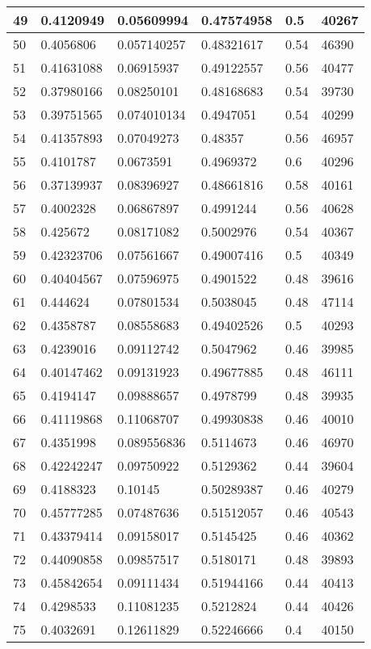 \begin{longtable}{|l|l|l|l|l|l|}
49 & 0.4120949 & 0.05609994 & 0.47574958 & 0.5 & 40267 \\ \hline 
50 & 0.4056806 & 0.057140257 & 0.48321617 & 0.54 & 46390 \\ \hline 
51 & 0.41631088 & 0.06915937 & 0.49122557 & 0.56 & 40477 \\ \hline 
52 & 0.37980166 & 0.08250101 & 0.48168683 & 0.54 & 39730 \\ \hline 
53 & 0.39751565 & 0.074010134 & 0.4947051 & 0.54 & 40299 \\ \hline 
54 & 0.41357893 & 0.07049273 & 0.48357 & 0.56 & 46957 \\ \hline 
55 & 0.4101787 & 0.0673591 & 0.4969372 & 0.6 & 40296 \\ \hline 
56 & 0.37139937 & 0.08396927 & 0.48661816 & 0.58 & 40161 \\ \hline 
57 & 0.4002328 & 0.06867897 & 0.4991244 & 0.56 & 40628 \\ \hline 
58 & 0.425672 & 0.08171082 & 0.5002976 & 0.54 & 40367 \\ \hline 
59 & 0.42323706 & 0.07561667 & 0.49007416 & 0.5 & 40349 \\ \hline 
60 & 0.40404567 & 0.07596975 & 0.4901522 & 0.48 & 39616 \\ \hline 
61 & 0.444624 & 0.07801534 & 0.5038045 & 0.48 & 47114 \\ \hline 
62 & 0.4358787 & 0.08558683 & 0.49402526 & 0.5 & 40293 \\ \hline 
63 & 0.4239016 & 0.09112742 & 0.5047962 & 0.46 & 39985 \\ \hline 
64 & 0.40147462 & 0.09131923 & 0.49677885 & 0.48 & 46111 \\ \hline 
65 & 0.4194147 & 0.09888657 & 0.4978799 & 0.48 & 39935 \\ \hline 
66 & 0.41119868 & 0.11068707 & 0.49930838 & 0.46 & 40010 \\ \hline 
67 & 0.4351998 & 0.089556836 & 0.5114673 & 0.46 & 46970 \\ \hline 
68 & 0.42242247 & 0.09750922 & 0.5129362 & 0.44 & 39604 \\ \hline 
69 & 0.4188323 & 0.10145 & 0.50289387 & 0.46 & 40279 \\ \hline 
70 & 0.45777285 & 0.07487636 & 0.51512057 & 0.46 & 40543 \\ \hline 
71 & 0.43379414 & 0.09158017 & 0.5145425 & 0.46 & 40362 \\ \hline 
72 & 0.44090858 & 0.09857517 & 0.5180171 & 0.48 & 39893 \\ \hline 
73 & 0.45842654 & 0.09111434 & 0.51944166 & 0.44 & 40413 \\ \hline 
74 & 0.4298533 & 0.11081235 & 0.5212824 & 0.44 & 40426 \\ \hline 
75 & 0.4032691 & 0.12611829 & 0.52246666 & 0.4 & 40150 \\ \hline 
\end{longtable}